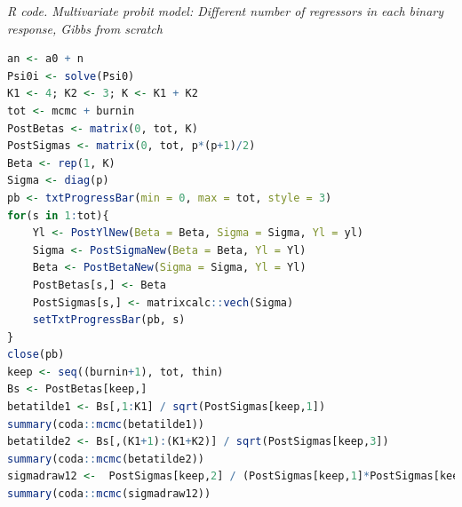 \begin{enumerate}[leftmargin=*]
\begin{tcolorbox}[enhanced,width=4.67in,center upper,
	fontupper=\large\bfseries,drop shadow southwest,sharp corners]
	\textit{R code. Multivariate probit model: Different number of regressors in each binary response, Gibbs from scratch}
	\begin{VF}
		\begin{lstlisting}[language=R]
an <- a0 + n
Psi0i <- solve(Psi0)
K1 <- 4; K2 <- 3; K <- K1 + K2
tot <- mcmc + burnin
PostBetas <- matrix(0, tot, K)
PostSigmas <- matrix(0, tot, p*(p+1)/2)
Beta <- rep(1, K)
Sigma <- diag(p)
pb <- txtProgressBar(min = 0, max = tot, style = 3)
for(s in 1:tot){
	Yl <- PostYlNew(Beta = Beta, Sigma = Sigma, Yl = yl)
	Sigma <- PostSigmaNew(Beta = Beta, Yl = Yl)
	Beta <- PostBetaNew(Sigma = Sigma, Yl = Yl)
	PostBetas[s,] <- Beta
	PostSigmas[s,] <- matrixcalc::vech(Sigma)
	setTxtProgressBar(pb, s)
}
close(pb)
keep <- seq((burnin+1), tot, thin)
Bs <- PostBetas[keep,]
betatilde1 <- Bs[,1:K1] / sqrt(PostSigmas[keep,1])
summary(coda::mcmc(betatilde1))
betatilde2 <- Bs[,(K1+1):(K1+K2)] / sqrt(PostSigmas[keep,3])
summary(coda::mcmc(betatilde2))
sigmadraw12 <-  PostSigmas[keep,2] / (PostSigmas[keep,1]*PostSigmas[keep,3])^0.5
summary(coda::mcmc(sigmadraw12))
\end{lstlisting}
	\end{VF}
\end{tcolorbox}

\end{enumerate}